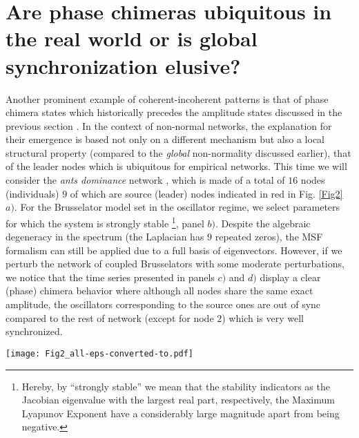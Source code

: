 \documentclass[prx,twocolumn,amsmath,noshowkeys,noshowpacs,amssymb]{revtex4-2}
\begin{document}

{\section{Are phase chimeras ubiquitous in the real world or is global synchronization elusive?}}
\label{sec:IV}

Another prominent example of coherent-incoherent patterns is that of phase chimera states which historically precedes the amplitude states discussed in the previous section \cite{chimera, Abrams_Strogatz}. {In the context of non-normal networks, the explanation for their emergence is} based not only on a different mechanism but also a local structural property (compared to the \emph{global} non-normality discussed earlier), that of the leader nodes which is ubiquitous for {empirical} networks. This time we will consider the \emph{ants dominance} network \cite{ref44}, which is made of a total of $16$ nodes (individuals) $9$ of which are source (leader) nodes indicated in red in Fig. \ref{Fig2} $a)$. For the Brusselator model set in the oscillator regime, we select parameters for which the system is strongly stable \footnote{Hereby, by ``strongly stable'' we mean that the stability indicators as the Jacobian eigenvalue with the largest real part, respectively, the Maximum Lyapunov Exponent have a considerably large magnitude apart from being negative.}, panel $b)$. Despite the algebraic degeneracy in the spectrum (the Laplacian has $9$ repeated zeros), the MSF formalism can still be applied due to a full basis of eigenvectors. However, if we perturb the network of coupled Brusselators with some moderate perturbations, we notice that the time series presented in panels $c)$ and $d)$ display a clear (phase) chimera behavior where although all nodes share the same exact amplitude, the oscillators corresponding to the source ones are out of sync compared to the rest of network (except for node $2$) which is very well synchronized. 

\begin{figure*}%
	\centering
	\texttt{[image: Fig2\_all-eps-converted-to.pdf]}
	\caption{\textbf{Emergence of phase chimera states.} $\textbf{a)}$ The graphic representation of the \textit{ants dominance} network \cite{ref44} ordered hierarchically. $\textbf{b)}$ The Master Stability Function shows no (local) instability, however, there are $9$ zero overlaying eigenvalues in the MSF curve.  $\textbf{c)}$ The time series for each oscillator zoomed (lower part) and the complete evolution (upper part). $\textbf{d)}$ The colormap representation of the oscillators dynamics evolution with the synchronized clusters emphasized with the magenta rectangle. The colorbar quantifies the oscillators amplitudes. {Notice that due to the random initial perturbation of the system, some of the sources belong to the synchronized cluster just by chance.} The parameters for the Brusselator model are $b=2.5$, $c=1$, $D_u=0.0175$, and $D_v=0.075$.}
	\label{Fig2}
\end{figure*}
\end{document}
